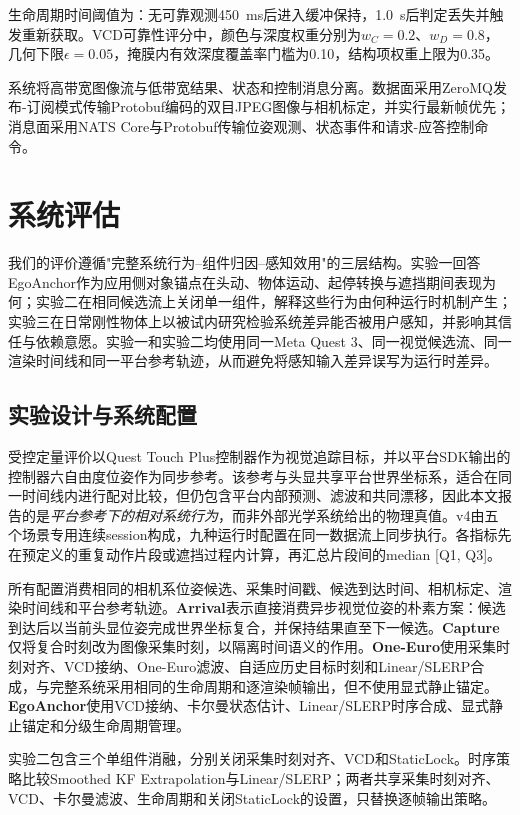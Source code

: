 \documentclass[review]{vgtc}
\begin{document}
生命周期时间阈值为：无可靠观测450~ms后进入缓冲保持，1.0~s后判定丢失并触发重新获取。VCD可靠性评分中，颜色与深度权重分别为$w_C = 0.2$、$w_D = 0.8$，几何下限$\epsilon = 0.05$，掩膜内有效深度覆盖率门槛为0.10，结构项权重上限为0.35。

系统将高带宽图像流与低带宽结果、状态和控制消息分离。数据面采用ZeroMQ发布-订阅模式传输Protobuf编码的双目JPEG图像与相机标定，并实行最新帧优先；消息面采用NATS Core与Protobuf传输位姿观测、状态事件和请求-应答控制命令。

\section{系统评估}\label{sec:evaluation}

我们的评价遵循"完整系统行为--组件归因--感知效用"的三层结构。实验一回答EgoAnchor作为应用侧对象锚点在头动、物体运动、起停转换与遮挡期间表现为何；实验二在相同候选流上关闭单一组件，解释这些行为由何种运行时机制产生；实验三在日常刚性物体上以被试内研究检验系统差异能否被用户感知，并影响其信任与依赖意愿。实验一和实验二均使用同一Meta Quest 3、同一视觉候选流、同一渲染时间线和同一平台参考轨迹，从而避免将感知输入差异误写为运行时差异。

\subsection{实验设计与系统配置}

受控定量评价以Quest Touch Plus控制器作为视觉追踪目标，并以平台SDK输出的控制器六自由度位姿作为同步参考。该参考与头显共享平台世界坐标系，适合在同一时间线内进行配对比较，但仍包含平台内部预测、滤波和共同漂移，因此本文报告的是\emph{平台参考下的相对系统行为}，而非外部光学系统给出的物理真值。v4由五个场景专用连续session构成，九种运行时配置在同一数据流上同步执行。各指标先在预定义的重复动作片段或遮挡过程内计算，再汇总片段间的median [Q1, Q3]。

所有配置消费相同的相机系位姿候选、采集时间戳、候选到达时间、相机标定、渲染时间线和平台参考轨迹。\textbf{Arrival}表示直接消费异步视觉位姿的朴素方案：候选到达后以当前头显位姿完成世界坐标复合，并保持结果直至下一候选。\textbf{Capture}仅将复合时刻改为图像采集时刻，以隔离时间语义的作用。\textbf{One-Euro}使用采集时刻对齐、VCD接纳、One-Euro滤波、自适应历史目标时刻和Linear/SLERP合成，与完整系统采用相同的生命周期和逐渲染帧输出，但不使用显式静止锚定。\textbf{EgoAnchor}使用VCD接纳、卡尔曼状态估计、Linear/SLERP时序合成、显式静止锚定和分级生命周期管理。

实验二包含三个单组件消融，分别关闭采集时刻对齐、VCD和StaticLock。时序策略比较Smoothed KF Extrapolation与Linear/SLERP；两者共享采集时刻对齐、VCD、卡尔曼滤波、生命周期和关闭StaticLock的设置，只替换逐帧输出策略。
\end{document}
